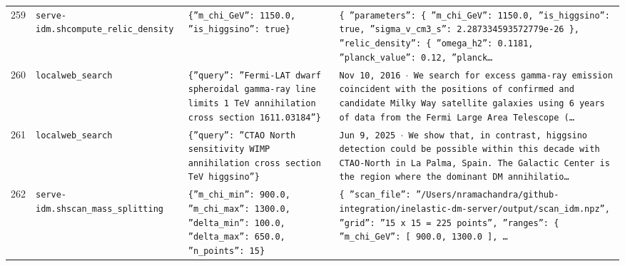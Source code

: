 \documentclass[11pt,a4paper]{article}
\begin{document}
\begin{longtable}{@{}p{}p{}p{}p{}@{}}
259 & \texttt{serve-idm.sh}\newline\texttt{compute\_\allowbreak{}relic\_\allowbreak{}density} & \texttt{\{''m\_\allowbreak{}chi\_\allowbreak{}GeV'':\allowbreak{} 1150.0,\allowbreak{} ''is\_\allowbreak{}higgsino'':\allowbreak{} true\}\allowbreak{}} & \texttt{\{   ''parameters'':\allowbreak{} \{     ''m\_\allowbreak{}chi\_\allowbreak{}GeV'':\allowbreak{} 1150.0,\allowbreak{}     ''is\_\allowbreak{}higgsino'':\allowbreak{} true,\allowbreak{}     ''sigma\_\allowbreak{}v\_\allowbreak{}cm3\_\allowbreak{}s'':\allowbreak{} 2.287334593572779e-26   \}\allowbreak{},\allowbreak{}   ''relic\_\allowbreak{}density'':\allowbreak{} \{     ''omega\_\allowbreak{}h2'':\allowbreak{} 0.1181,\allowbreak{}     ''planck\_\allowbreak{}value'':\allowbreak{} 0.12,\allowbreak{}     ''planck\ldots{}\allowbreak{}} \\
260 & \texttt{local}\newline\texttt{web\_\allowbreak{}search} & \texttt{\{''query'':\allowbreak{} ''Fermi-LAT dwarf spheroidal gamma-ray line limits 1 TeV annihilation cross section 1611.03184''\}\allowbreak{}} & \texttt{Nov 10,\allowbreak{} 2016 $\cdot$ We search for excess gamma-ray emission coincident with the positions of confirmed and candidate Milky Way satellite galaxies using 6 years of data from the Fermi Large Area Telescope (\ldots{}\allowbreak{}} \\
261 & \texttt{local}\newline\texttt{web\_\allowbreak{}search} & \texttt{\{''query'':\allowbreak{} ''CTAO North sensitivity WIMP annihilation cross section TeV higgsino''\}\allowbreak{}} & \texttt{Jun 9,\allowbreak{} 2025 $\cdot$ We show that,\allowbreak{} in contrast,\allowbreak{} higgsino detection could be possible within this decade with CTAO-North in La Palma,\allowbreak{} Spain. The Galactic Center is the region where the dominant DM annihilatio\ldots{}\allowbreak{}} \\
262 & \texttt{serve-idm.sh}\newline\texttt{scan\_\allowbreak{}mass\_\allowbreak{}splitting} & \texttt{\{''m\_\allowbreak{}chi\_\allowbreak{}min'':\allowbreak{} 900.0,\allowbreak{} ''m\_\allowbreak{}chi\_\allowbreak{}max'':\allowbreak{} 1300.0,\allowbreak{} ''delta\_\allowbreak{}min'':\allowbreak{} 100.0,\allowbreak{} ''delta\_\allowbreak{}max'':\allowbreak{} 650.0,\allowbreak{} ''n\_\allowbreak{}points'':\allowbreak{} 15\}\allowbreak{}} & \texttt{\{   ''scan\_\allowbreak{}file'':\allowbreak{} ''/\allowbreak{}Users/\allowbreak{}nramachandra/\allowbreak{}github-integration/\allowbreak{}inelastic-dm-server/\allowbreak{}output/\allowbreak{}scan\_\allowbreak{}idm.npz'',\allowbreak{}   ''grid'':\allowbreak{} ''15 x 15 =\allowbreak{} 225 points'',\allowbreak{}   ''ranges'':\allowbreak{} \{     ''m\_\allowbreak{}chi\_\allowbreak{}GeV'':\allowbreak{} [       900.0,\allowbreak{}       1300.0     ]\allowbreak{},\allowbreak{}  \ldots{}\allowbreak{}} \\

\end{longtable}
\end{document}
